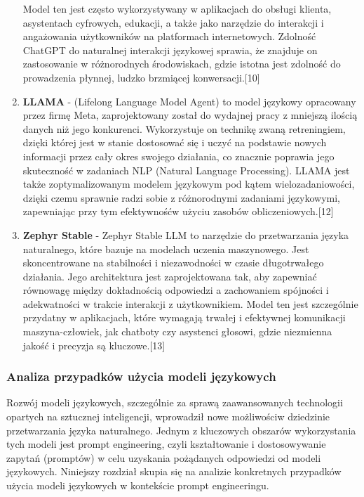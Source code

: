 \begin{enumerate}
Model ten jest często wykorzystywany w aplikacjach do obsługi klienta, asystentach cyfrowych, edukacji, a także jako narzędzie do interakcji i angażowania użytkowników na platformach internetowych. Zdolność ChatGPT do naturalnej interakcji językowej sprawia, że znajduje on zastosowanie w różnorodnych środowiskach, gdzie istotna jest zdolność do prowadzenia płynnej, ludzko brzmiącej konwersacji.[10]
\\
\item {\bf LLAMA} - (Lifelong Language Model Agent) to model językowy opracowany przez firmę Meta, zaprojektowany został do wydajnej pracy \linebreak z mniejszą ilością danych niż jego konkurenci. Wykorzystuje on technikę zwaną retreningiem, dzięki której jest w stanie dostosować się i uczyć na podstawie nowych informacji przez cały okres swojego działania, co znacznie poprawia jego skuteczność w zadaniach NLP (Natural Language Processing). LLAMA jest także zoptymalizowanym modelem językowym pod kątem wielozadaniowości, dzięki czemu sprawnie radzi sobie \linebreak z różnorodnymi zadaniami językowymi, zapewniając przy tym efektywność\linebreak w użyciu zasobów obliczeniowych.[12]
\\
\item {\bf Zephyr Stable} - Zephyr Stable LLM to narzędzie do przetwarzania języka naturalnego, które bazuje na modelach uczenia maszynowego. Jest skoncentrowane na stabilności i niezawodności w czasie długotrwałego działania. Jego architektura jest zaprojektowana tak, aby zapewniać równowagę między dokładnością odpowiedzi a zachowaniem spójności i adekwatności w trakcie interakcji z użytkownikiem. Model ten jest szczególnie przydatny w aplikacjach, które wymagają trwałej i efektywnej komunikacji maszyna-człowiek, jak chatboty czy asystenci głosowi, gdzie niezmienna jakość i precyzja są kluczowe.[13]
\\

\end{enumerate}

\subsubsection{Analiza przypadków użycia modeli językowych}

Rozwój modeli językowych, szczególnie za sprawą zaawansowanych technologii opartych na sztucznej inteligencji, wprowadził nowe możliwości\linebreak w dziedzinie przetwarzania języka naturalnego. Jednym z kluczowych obszarów wykorzystania tych modeli jest prompt engineering, czyli kształtowanie i dostosowywanie zapytań (promptów) w celu uzyskania pożądanych odpowiedzi od modeli językowych. Niniejszy rozdział skupia się na analizie konkretnych przypadków użycia modeli językowych w kontekście prompt engineeringu.

